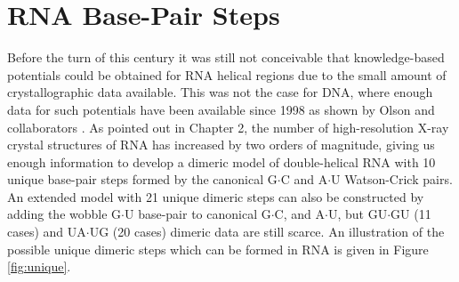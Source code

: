 \chapter{RNA Base-Pair Steps}
\label{basepairsteps} 

Before  the turn of  this century  it was  still not  conceivable that
knowledge-based potentials  could be obtained for  RNA helical regions
due to the  small amount of crystallographic data  available. This was
not the case for DNA, where  enough data for such potentials have been
available   since   1998  as   shown   by   Olson  and   collaborators
\cite{olson1998}.   As  pointed  out  in  Chapter  2,  the  number  of
high-resolution X-ray  crystal structures of RNA has  increased by two
orders of magnitude, giving us enough information to develop a dimeric
model of double-helical  RNA with 10 unique base-pair  steps formed by
the canonical G$\cdot$C and A$\cdot$U Watson-Crick pairs.  An extended
model with 21  unique dimeric steps can also  be constructed by adding
the wobble G$\cdot$U base-pair  to canonical G$\cdot$C, and A$\cdot$U,
but GU$\cdot$GU (11 cases) and UA$\cdot$UG (20 cases) dimeric data are
still  scarce. An illustration  of the  possible unique  dimeric steps
which can be formed in RNA is given in Figure \ref{fig:unique}.  

